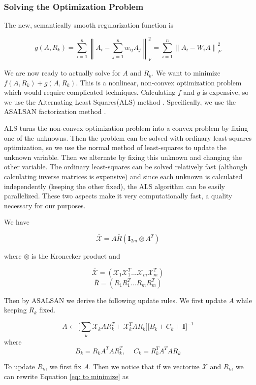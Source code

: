 \documentclass[pageno]{final_paper}
\newcommand{\norm}[1]{\left\lVert#1\right\rVert}
\begin{document}
\subsubsection{Solving the Optimization Problem}
\label{Solving the Optimization Problem}

The new, semantically smooth regularization function is

\begin{equation}
    \label{eq: new g}
    g(A, R_k) = \sum_{i=1}^n \norm{A_i - \sum_{j=1}^n w_{ij}A_j}_F^2 =
    \sum_{i=1}^n \norm{A_i - W_iA}_F^2
\end{equation}

We are now ready to actually solve for $A$ and $R_k$. We want to minimize $f(A,
R_k) + g(A, R_k)$. This is a nonlinear, non-convex optimization problem which
would require complicated techniques. Calculating $f$ and $g$ is expensive, so
we use the Alternating Least Squares(ALS) method \cite{Koren2009}. Specifically,
we use the ASALSAN factorization method \cite{Bader2007}.

ALS turns the non-convex optimization problem into a convex problem by fixing
one of the unknowns. Then the problem can be solved with ordinary least-squares
optimization, so we use the normal method of least-squares to update the unknown
variable. Then we alternate by fixing this unknown and changing the other
variable. The ordinary least-squares can be solved relatively fast (although
calculating inverse matrices is expensive) and since each unknown is calculated
independently (keeping the other fixed), the ALS algorithm can be easily
parallelized. These two aspects make it very computationally fast, a quality
necessary for our purposes.

We have

$$\bar{\mathcal{X}} = A\bar{R}(\mathbf{I}_{2m} \otimes A^T)$$

where $\otimes$ is the Kronecker product and

$$\bar{\mathcal{X}} = \left( \mathcal{X}_1\mathcal{X}_1^T ... \mathcal{X}_m\mathcal{X}_m^T \right)$$
$$\bar{R} = \left( R_1 R_1^T ... R_mR_m^T \right)$$

Then by ASALSAN we derive the following update rules. We first update $A$ while
keeping $R_k$ fixed.

$$A \leftarrow \bigg[ \sum_k \mathcal{X}_kAR_k^T + \mathcal{X}_k^TAR_k \bigg] \bigg[ B_k + C_k + \mathbf{I} \bigg]^{-1}$$
where
$$B_k = R_k A^T AR_k^T,\,\,\,\,\,\,\, C_k = R_k^TA^TAR_k$$

To update $R_k$, we first fix $A$. Then we notice that if we vectorize
$\mathcal{X}$ and $R_k$, we can rewrite Equation \ref{eq: to minimize} as
\end{document}
